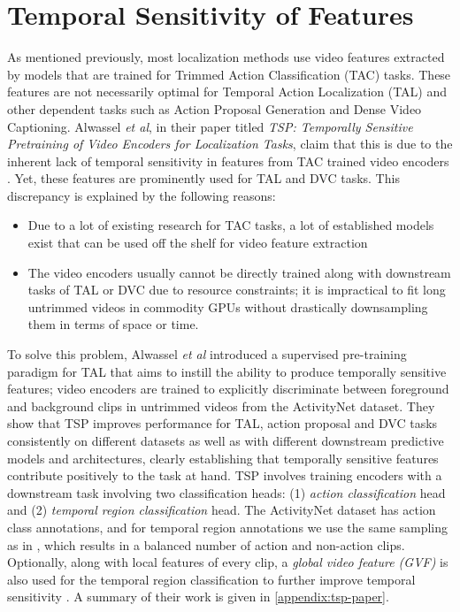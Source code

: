 \section{Temporal Sensitivity of Features}
\par As mentioned previously, most localization methods use video features extracted by models that are trained for Trimmed Action Classification (TAC) tasks. These features are not necessarily optimal for Temporal Action Localization (TAL) and other dependent tasks such as Action Proposal Generation and Dense Video Captioning. Alwassel \textit{et al}, in their paper titled \textit{TSP: Temporally Sensitive Pretraining of Video Encoders for Localization Tasks}, claim that this is due to the inherent lack of temporal sensitivity in features from TAC trained video encoders \cite{alwassel2021tsp}. Yet, these features are prominently used for TAL and DVC tasks. This discrepancy is explained by the following reasons:
\begin{itemize}
	\item Due to a lot of existing research for TAC tasks, a lot of established models exist that can be used off the shelf for video feature extraction
	\item The video encoders usually cannot be directly trained along with downstream tasks of TAL or DVC due to resource constraints; it is impractical to fit long untrimmed videos in commodity GPUs without drastically downsampling them in terms of space or time.
\end{itemize}

\par To solve this problem, Alwassel \textit{et al} introduced a supervised pre-training paradigm for TAL that aims to instill the ability to produce temporally sensitive features; video encoders are trained to explicitly discriminate between foreground and background clips in untrimmed videos from the ActivityNet dataset. They show that TSP improves performance for TAL, action proposal and DVC tasks consistently on different datasets as well as with different downstream predictive models and architectures, clearly establishing that temporally sensitive features contribute positively to the task at hand. TSP involves training encoders with a downstream task involving two classification heads: (1) \textit{action classification} head and (2) \textit{temporal region classification} head. The ActivityNet dataset has action class annotations, and for temporal region annotations we use the same sampling as in \cite{alwassel2021tsp}, which results in a balanced number of action and non-action clips. Optionally, along with local features of every clip, a \textit{global video feature (GVF)} is also used for the temporal region classification to further improve temporal sensitivity \cite{alwassel2021tsp}. A summary of their work is given in \ref{appendix:tsp-paper}.


